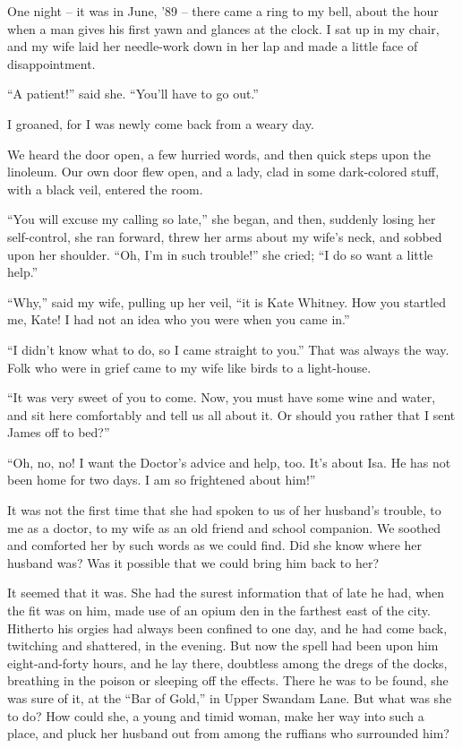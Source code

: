 One night -- it was in June, ’89 -- there came a ring to my
bell, about the hour when a man gives his first yawn and
glances at the clock. I sat up in my chair, and my wife laid
her needle-work down in her lap and made a little face of
disappointment.

“A patient!” said she. “You’ll have to go out.”

I groaned, for I was newly come back from a weary day.

We heard the door open, a few hurried words, and then
quick steps upon the linoleum. Our own door flew open, and
a lady, clad in some dark-colored stuff, with a black veil, entered
the room.

“You will excuse my calling so late,” she began, and then,
suddenly losing her self-control, she ran forward, threw her
arms about my wife’s neck, and sobbed upon her shoulder.
“Oh, I’m in such trouble!” she cried; “I do so want a little
help.”

“Why,” said my wife, pulling up her veil, “it is Kate Whitney.
How you startled me, Kate! I had not an idea who
you were when you came in.”

“I didn’t know what to do, so I came straight to you.”
That was always the way. Folk who were in grief came to
my wife like birds to a light-house.

“It was very sweet of you to come. Now, you must have
some wine and water, and sit here comfortably and tell us all
about it. Or should you rather that I sent James off to bed?”

“Oh, no, no! I want the Doctor’s advice and help, too.
It’s about Isa. He has not been home for two days. I am
so frightened about him!”

It was not the first time that she had spoken to us of her
husband’s trouble, to me as a doctor, to my wife as an old
friend and school companion. We soothed and comforted
her by such words as we could find. Did she know where
her husband was? Was it possible that we could bring him
back to her?

It seemed that it was. She had the surest information that
of late he had, when the fit was on him, made use of an opium
den in the farthest east of the city. Hitherto his orgies had
always been confined to one day, and he had come back,
twitching and shattered, in the evening. But now the spell
had been upon him eight-and-forty hours, and he lay there,
doubtless among the dregs of the docks, breathing in the
poison or sleeping off the effects. There he was to be found,
she was sure of it, at the “Bar of Gold,” in Upper Swandam
Lane. But what was she to do? How could she, a young
and timid woman, make her way into such a place, and pluck
her husband out from among the ruffians who surrounded
him?

